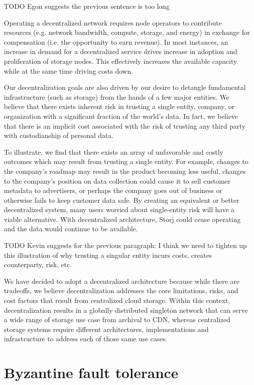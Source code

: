 \documentclass[11pt,fleqn,openany]{book}
\newcommand{\todo}[1]{{\color{red} TODO #1 }}
\begin{document}
\todo{Egon suggests the previous sentence is too long}

Operating a decentralized network requires node operators to contribute
resources (e.g. network bandwidth, compute, storage, and energy) in exchange
for compensation (i.e. the opportunity to earn revenue).
In most instances, an increase in demand for a decentralized service drives
increase in adoption and proliferation of storage nodes.
This effectively increases the available capacity while at the same time
driving costs down.

Our decentralization goals are also driven by our desire to detangle
fundamental infrastructure (such as storage) from the hands of a few major
entities.
We believe that there exists inherent risk in trusting a single entity,
company, or organization with a significant fraction of the world's data.
In fact, we believe that there is an implicit cost associated with the risk of
trusting any third party with custodianship of personal data.

To illustrate, we find that there exists an array of unfavorable
and costly outcomes which may result from trusting a single entity.
For example, changes to the company's roadmap may result in the product
becoming less useful, changes to the company's position on data collection could
cause it to sell customer metadata to advertisers, or perhaps the company goes
out of business or otherwise fails to keep customer data safe.
By creating an equivalent or better decentralized
system, many users worried about single-entity risk will have a viable
alternative.
With decentralized architecture, Storj could cease operating and the data
would continue to be available.

\todo{Kevin suggests for the previous paragraph:
I think we need to tighten up this illustration of why trusting a singular entity incurs costs, creates counterparty, risk, etc.}

We have decided to adopt a decentralized architecture because while there
are tradeoffs, we believe decentralization addresses the core limitations,
risks, and cost factors that result from centralized cloud storage.
Within this context,
decentralization results in a globally distributed singleton network that can
serve a wide range of storage use case from archival to CDN, whereas
centralized storage systems require different architectures, implementations
and infrastructure to address each of those same use cases.

\section{Byzantine fault tolerance}
\end{document}
